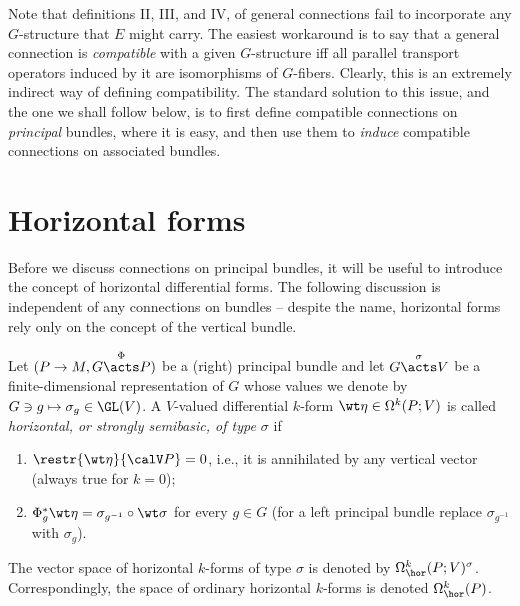 \begin{rem}
    Note that definitions II, III, and IV, of general connections fail to incorporate any $G$-structure that $E$ might carry. The easiest workaround is to say that a general connection is \emph{compatible} with a given $G$-structure iff all parallel transport operators induced by it are isomorphisms of $G$-fibers. Clearly, this is an extremely indirect way of defining compatibility. The standard solution to this issue, and the one we shall follow below, is to first define compatible connections on \emph{principal} bundles, where it is easy, and then use them to \emph{induce} compatible connections on associated bundles.
\end{rem}







\section{Horizontal forms}

Before we discuss connections on principal bundles, it will be useful to introduce the concept of horizontal differential forms. The following discussion is independent of any connections on bundles -- despite the name, horizontal forms rely only on the concept of the vertical bundle.

\begin{defn}
    Let $(P\to M,G\overset{\Phi}{\acts} P)$ be a (right) principal bundle and let $G\overset{\sigma}{\acts}V$ be a finite-dimensional representation of $G$ whose values we denote by $G\ni g\mapsto \sigma_g\in \GL(V)$. A $V$-valued differential $k$-form $\wt\eta\in\Omega^k(P;V)$ is called \emph{horizontal, or strongly semibasic, of type $\sigma$} if
    \begin{enumerate}
        \item $\restr{\wt\eta}{\calV P}=0$, i.e., it is annihilated by any vertical vector (always true for $k=0$);
        \item $\Phi_g^\ast \wt\eta=\sigma_{g^{-1}}\circ\wt\sigma$ for every $g\in G$ (for a left principal bundle replace $\sigma_{g^{-1}}$ with $\sigma_g$).
    \end{enumerate}
    The vector space of horizontal $k$-forms of type $\sigma$ is denoted by $\Omega^k_{\hor}(P;V)^\sigma$. Correspondingly, the space of ordinary horizontal $k$-forms is denoted $\Omega^k_{\hor}(P)$. 
\end{defn}


